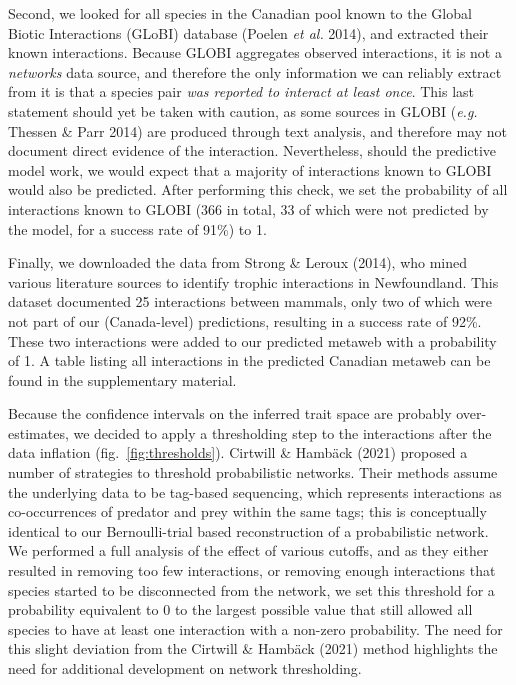 \documentclass[11pt]{article}
\begin{document}
Second, we looked for all species in the Canadian pool known to the
Global Biotic Interactions (GLoBI) database (Poelen \emph{et al.} 2014),
and extracted their known interactions. Because GLOBI aggregates
observed interactions, it is not a \emph{networks} data source, and
therefore the only information we can reliably extract from it is that a
species pair \emph{was reported to interact at least once}. This last
statement should yet be taken with caution, as some sources in GLOBI
(\emph{e.g.} Thessen \& Parr 2014) are produced through text analysis,
and therefore may not document direct evidence of the interaction.
Nevertheless, should the predictive model work, we would expect that a
majority of interactions known to GLOBI would also be predicted. After
performing this check, we set the probability of all interactions known
to GLOBI (366 in total, 33 of which were not predicted by the model, for
a success rate of 91\%) to 1.

Finally, we downloaded the data from Strong \& Leroux (2014), who mined
various literature sources to identify trophic interactions in
Newfoundland. This dataset documented 25 interactions between mammals,
only two of which were not part of our (Canada-level) predictions,
resulting in a success rate of 92\%. These two interactions were added
to our predicted metaweb with a probability of 1. A table listing all
interactions in the predicted Canadian metaweb can be found in the
supplementary material.

Because the confidence intervals on the inferred trait space are
probably over-estimates, we decided to apply a thresholding step to the
interactions after the data inflation (fig.~\ref{fig:thresholds}).
Cirtwill \& Hambäck (2021) proposed a number of strategies to threshold
probabilistic networks. Their methods assume the underlying data to be
tag-based sequencing, which represents interactions as co-occurrences of
predator and prey within the same tags; this is conceptually identical
to our Bernoulli-trial based reconstruction of a probabilistic network.
We performed a full analysis of the effect of various cutoffs, and as
they either resulted in removing too few interactions, or removing
enough interactions that species started to be disconnected from the
network, we set this threshold for a probability equivalent to 0 to the
largest possible value that still allowed all species to have at least
one interaction with a non-zero probability. The need for this slight
deviation from the Cirtwill \& Hambäck (2021) method highlights the need
for additional development on network thresholding.
\end{document}

